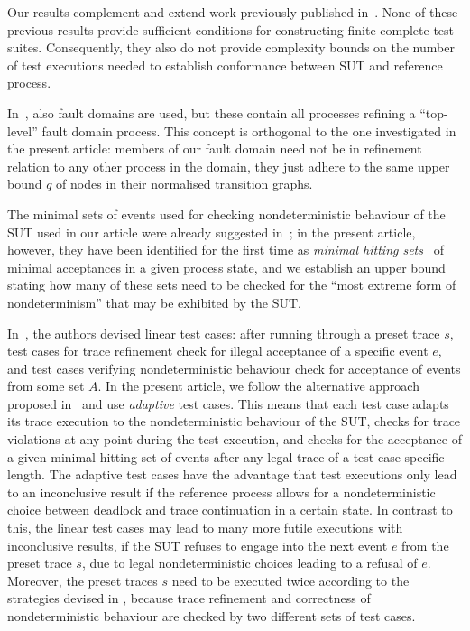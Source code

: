 Our results complement and extend work previously published  
in~\cite{Hennessy:1988:ATP:50497,DBLP:conf/fm/PeleskaS96,peleska1997a,DBLP:conf/icfem/CavalcantiG07,DBLP:conf/pts/CavalcantiS17}. None of these previous results provide
sufficient conditions 
for constructing finite complete test suites. Consequently, they also do not provide complexity bounds on the number of test executions needed to establish conformance between SUT and reference process.

In~\cite{DBLP:conf/pts/CavalcantiS17}, 
also fault domains are used, but these contain all processes refining a ``top-level'' fault domain process. This concept is orthogonal to the one investigated in the present article:
members of our fault domain need not be in refinement relation to any other process in the domain, they just adhere to the same upper bound $q$ of nodes in their normalised transition graphs. 

The minimal sets of events used for checking nondeterministic behaviour of the SUT used in our article were already suggested in~\cite{DBLP:conf/fm/PeleskaS96,peleska1997a,DBLP:conf/icfem/CavalcantiG07}; in the present article, however, they have been identified for the first time as {\it minimal hitting sets}~\cite{5533149} of minimal acceptances in a given process state, and we establish an upper bound stating how many of these sets need to be checked for the ``most extreme form of nondeterminism'' that may be exhibited by the SUT.


In~\cite{Hennessy:1988:ATP:50497,DBLP:conf/icfem/CavalcantiG07,DBLP:conf/pts/CavalcantiS17}, the authors devised linear test cases: after running through a preset trace $s$, test cases for trace refinement check for illegal acceptance of a specific event $e$, and test cases verifying  nondeterministic behaviour check for  acceptance of events from some set $A$. In the present article, we follow the alternative approach proposed in~\cite{DBLP:conf/fm/PeleskaS96,peleska1997a} and use {\it adaptive} test cases. This means that each test case
adapts its trace execution to the nondeterministic behaviour of the SUT, checks for 
  trace violations at any point during the test execution, and checks for the acceptance 
of a given minimal hitting set of events after any legal trace of a test case-specific length.
The adaptive test cases have the advantage that test executions only lead to an 
inconclusive result if the reference process allows for a nondeterministic choice between deadlock and trace continuation in a certain state. In contrast to this, the linear test cases 
may lead to many more futile executions with inconclusive results, if the SUT refuses 
to engage into the next event $e$ 
from the preset trace $s$, due to legal nondeterministic choices leading to a refusal of $e$.
Moreover, the preset traces $s$ need to be executed twice according to the strategies devised in 
\cite{Hennessy:1988:ATP:50497,DBLP:conf/icfem/CavalcantiG07,DBLP:conf/pts/CavalcantiS17}, because trace refinement and correctness of nondeterministic behaviour are checked by two different sets of test cases.

